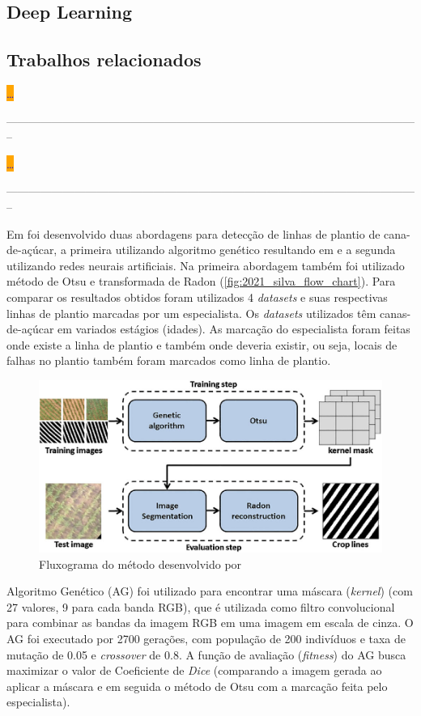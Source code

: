 \documentclass[12pt, a4paper, english, brazil]{article}
\newcommand{\dotsBlue}{\colorbox{orange}{\textcolor{blue}{\dots}}}
\newcommand{\linePage}{--------------------------------------------------------------------------------------------------------------}
\begin{document}
\subsection{Deep Learning}

\subsection{Trabalhos relacionados}

\cite{Souza_2017} \dotsBlue

\linePage

\cite{Souza_2018} \dotsBlue

\linePage

Em  foi desenvolvido duas abordagens para detecção de linhas de plantio de cana-de-açúcar, a primeira utilizando algoritmo genético resultando em  e a segunda utilizando redes neurais artificiais. Na primeira abordagem também foi utilizado método de Otsu e transformada de Radon (\autoref{fig:2021_silva_flow_chart}). Para comparar os resultados obtidos foram utilizados 4 \textit{datasets} e suas respectivas linhas de plantio marcadas por um especialista. Os \textit{datasets} utilizados têm canas-de-açúcar em variados estágios (idades). As marcação do especialista foram feitas onde existe a linha de plantio e também onde deveria existir, ou seja, locais de falhas no plantio também foram marcados como linha de plantio.

\begin{figure}[htbp]
    \centering
    \includegraphics[width=0.6\textheight]{img/2021_Silva_flow_chart.png}
    \caption{Fluxograma do método desenvolvido por  }
    \label{fig:2021_silva_flow_chart}
\end{figure}

Algoritmo Genético (AG) foi utilizado para encontrar uma máscara (\textit{kernel}) (com 27 valores, 9 para cada banda RGB), que é utilizada como filtro convolucional para combinar as bandas da imagem RGB em uma imagem em escala de cinza. O AG foi executado por 2700 gerações, com população de 200 indivíduos e taxa de mutação de 0.05 e \textit{crossover} de 0.8. A função de avaliação (\textit{fitness}) do AG busca maximizar o valor de Coeficiente de \textit{Dice} (comparando a imagem gerada ao aplicar a máscara e em seguida o método de Otsu com a marcação feita pelo especialista).
\end{document}
